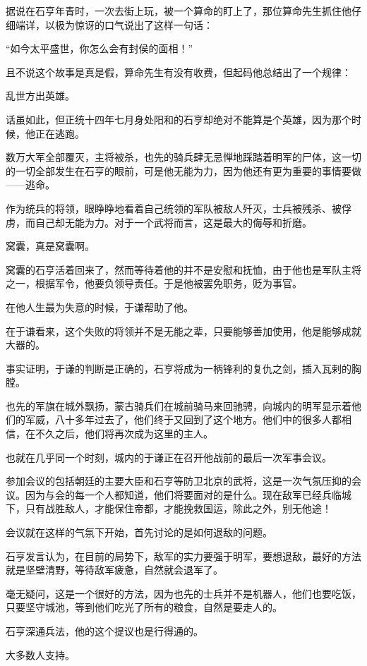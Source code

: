 \begin{multicols}{\theparacolNo}
据说在石亨年青时，一次去街上玩，被一个算命的盯上了，那位算命先生抓住他仔细端详，以极为惊讶的口气说出了这样一句话：

“如今太平盛世，你怎么会有封侯的面相！”

且不说这个故事是真是假，算命先生有没有收费，但起码他总结出了一个规律：

乱世方出英雄。

话虽如此，但正统十四年七月身处阳和的石亨却绝对不能算是个英雄，因为那个时候，他正在逃跑。

数万大军全部覆灭，主将被杀，也先的骑兵肆无忌惮地踩踏着明军的尸体，这一切的一切全部发生在石亨的眼前，可是他无能为力，因为他还有更为重要的事情要做——逃命。

作为统兵的将领，眼睁睁地看着自己统领的军队被敌人歼灭，士兵被残杀、被俘虏，而自己却无能为力。对于一个武将而言，这是最大的侮辱和折磨。

窝囊，真是窝囊啊。

窝囊的石亨活着回来了，然而等待着他的并不是安慰和抚恤，由于他也是军队主将之一，根据军令，他要负领导责任。于是他被罢免职务，贬为事官。

在他人生最为失意的时候，于谦帮助了他。

在于谦看来，这个失败的将领并不是无能之辈，只要能够善加使用，他是能够成就大器的。

事实证明，于谦的判断是正确的，石亨将成为一柄锋利的复仇之剑，插入瓦剌的胸膛。

也先的军旗在城外飘扬，蒙古骑兵们在城前骑马来回驰骋，向城内的明军显示着他们的军威，八十多年过去了，他们终于又回到了这个地方。他们中的很多人都相信，在不久之后，他们将再次成为这里的主人。

也就在几乎同一个时刻，城内的于谦正在召开他战前的最后一次军事会议。

参加会议的包括朝廷的主要大臣和石亨等防卫北京的武将，这是一次气氛压抑的会议。因为与会的每一个人都知道，他们将要面对的是什么。现在敌军已经兵临城下，只有战胜敌人，才能保住帝都，才能挽救国运，除此之外，别无他途！

会议就在这样的气氛下开始，首先讨论的是如何退敌的问题。

石亨发言认为，在目前的局势下，敌军的实力要强于明军，要想退敌，最好的方法就是坚壁清野，等待敌军疲惫，自然就会退军了。

毫无疑问，这是一个很好的方法，因为也先的士兵并不是机器人，他们也要吃饭，只要坚守城池，等到他们吃光了所有的粮食，自然是要走人的。

石亨深通兵法，他的这个提议也是行得通的。

大多数人支持。


\end{multicols}
